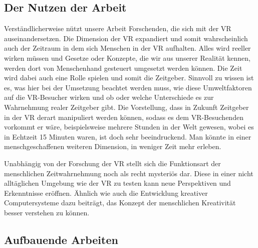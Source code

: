 \documentclass{Bericht}
\begin{document}
\subsection{Der Nutzen der Arbeit}
Verständlicherweise nützt unsere Arbeit Forschenden, die sich mit der VR auseinandersetzen. Die Dimension der VR expandiert und somit wahrscheinlich auch der Zeitraum in dem sich Menschen in der VR aufhalten. Alles wird reeller wirken müssen und Gesetze oder Konzepte, die wir aus unserer Realität kennen, werden dort von Menschenhand gesteuert umgesetzt werden können. Die Zeit wird dabei auch eine Rolle spielen und somit die Zeitgeber. Sinnvoll zu wissen ist es, was hier bei der Umsetzung beachtet werden muss, wie diese Umweltfaktoren auf die VR-Besucher wirken und ob oder welche Unterschiede es zur Wahrnehmung realer Zeitgeber gibt. Die Vorstellung, dass in Zukunft Zeitgeber in der VR derart manipuliert werden können, sodass es dem VR-Besuchenden vorkommt er wäre, beispielsweise mehrere Stunden in der Welt gewesen, wobei es in Echtzeit 15 Minuten waren, ist doch sehr beeindruckend. Man könnte in einer menschgeschaffenen weiteren Dimension, in weniger Zeit mehr erleben.
\par
Unabhängig von der Forschung der VR stellt sich die Funktionsart der menschlichen Zeitwahrnehmung noch als recht mysteriös dar. Diese in einer nicht alltäglichen Umgebung wie der VR zu testen kann neue Perspektiven und Erkenntnisse eröffnen. Ähnlich wie auch die Entwicklung kreativer Computersysteme dazu beiträgt, das Konzept der menschlichen Kreativität besser verstehen zu können.

\subsection{Aufbauende Arbeiten}
\end{document}
